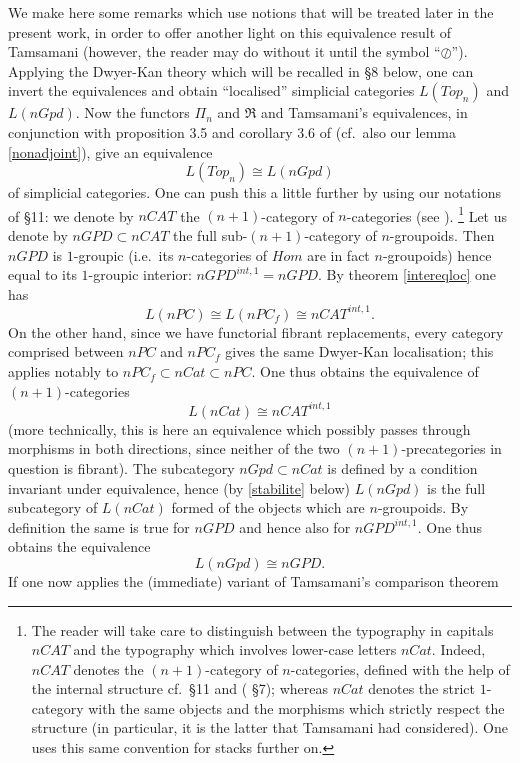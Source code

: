 We make here some remarks which use notions that will be
treated later in the present work, in order to offer another light
on this equivalence result of Tamsamani (however,
the reader may do without it until the symbol ``$\oslash$'').
Applying the
Dwyer-Kan theory \cite{DwyerKan3} which will be recalled in \S 8
below, one can invert the equivalences and obtain
``localised'' simplicial categories
$L(Top_n)$ and  $L(nGpd)$.
Now the functors $\Pi _n$ and $\Re$ and
Tamsamani's equivalences, in conjunction with proposition 3.5 and
corollary 3.6 of \cite{DwyerKan2} (cf.\ also our lemma \ref{nonadjoint}),
give an equivalence
$$
L(Top_n)\cong L(nGpd )
$$
of simplicial categories. One can push this a little further by using
our notations of \S 11: we denote by $nCAT$ the $(n+1)$-category of
$n$-categories (see \cite{nCAT}).
\footnote{
The reader will take care to distinguish between the typography in capitals
$nCAT$
and the typography which involves lower-case letters $nCat$.
Indeed, $nCAT$ denotes the $(n+1)$-category of $n$-categories,
defined with the help of the internal structure cf.\ \S 11 and (\cite{nCAT}
\S 7); whereas
$nCat$ denotes
the strict $1$-category with the same objects and the morphisms which strictly
respect
the structure (in particular, it is the latter that Tamsamani had
considered). One uses this same convention for stacks further on.}
%
%
%
Let us denote by $nGPD\subset nCAT$ the full sub-$(n+1)$-category of
$n$-groupoids. Then $nGPD$ is $1$-groupic (i.e.\ its
$n$-categories of
$Hom$ are in fact $n$-groupoids) hence equal to its $1$-groupic interior:
$nGPD^{int, 1}= nGPD$. By theorem \ref{intereqloc} one has
$$
L(nPC)\cong L(nPC_f)
\cong nCAT ^{int, 1}.
$$
On the other hand, since we have functorial fibrant replacements, every
category comprised between $nPC$ and $nPC_f$ gives the same Dwyer-Kan
localisation; this applies notably to $nPC_f \subset nCat \subset nPC$.
One thus obtains the equivalence of $(n+1)$-categories
$$
L(nCat)\cong nCAT^{int, 1}
$$
(more technically, this is here an equivalence which possibly passes through
morphisms in both directions, since neither of the two $(n+1)$-precategories in
question is
fibrant).
The subcategory $nGpd\subset nCat$ is defined by a condition
invariant under equivalence, hence (by \ref{stabilite} below) $L(nGpd)$
is the full subcategory of $L(nCat)$ formed of the objects which are
$n$-groupoids. By definition the same is true for $nGPD$ and hence
also for $nGPD^{int, 1}$. One thus obtains the equivalence
$$
L(nGpd) \cong nGPD.
$$
If one now applies the (immediate) variant
of Tamsamani's comparison theorem
